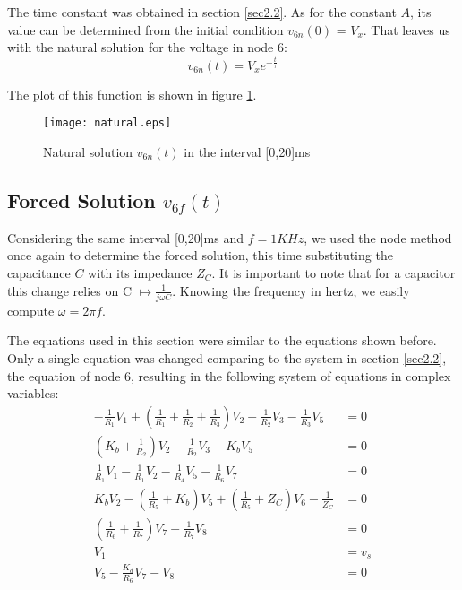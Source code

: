 The time constant was obtained in section \ref{sec2.2}. As for the constant $A$, its value can be determined from the initial condition $v_{6n}(0)$ = $V_x$. That leaves us with the natural solution for the voltage in node 6:
\begin{equation}
    v_{6n}(t) = V_x e^{-\frac{t}{\tau}}
\end{equation}

The plot of this function is shown in figure \ref{fig2}.

\begin{figure}[!htp] \centering
\texttt{[image: natural.eps]}
\caption{Natural solution $v_{6n}(t)$ in the interval [0,20]ms}
\label{fig2}
\end{figure}
\FloatBarrier

\subsection{Forced Solution $v_{6f}(t)$}\label{sec2.4}

Considering the same interval [0,20]ms and $f=1 KHz$, we used the node method once again to determine the forced solution, this time substituting the capacitance $C$ with its impedance $Z_C$. It is important to note that for a capacitor this change relies on C $\mapsto \frac{1}{j \omega C}$. Knowing the frequency in hertz, we easily compute $\omega=2 \pi f$.

The equations used in this section were similar to the equations shown before. Only a single equation was changed comparing to the system in section \ref{sec2.2}, the equation of node 6, resulting in the following system of equations in complex variables:
\begin{equation} \label{eq4}
\begin{split}
-\frac{1}{R_1}V_1+\left(\frac{1}{R_1}+\frac{1}{R_2}+\frac{1}{R_3}\right)V_2-\frac{1}{R_2}V_3-\frac{1}{R_3}V_5&=0\\
\left(K_b+\frac{1}{R_2}\right)V_2-\frac{1}{R_2}V_3-K_b V_5&=0\\
\frac{1}{R_1}V_1-\frac{1}{R_1}V_2-\frac{1}{R_4}V_5-\frac{1}{R_6}V_7&=0\\
K_bV_2 - (\frac{1}{R_5}+K_b)V_5 + (\frac{1}{R_5}+Z_C)V_6 - \frac{1}{Z_C}&=0\\
\left(\frac{1}{R_6}+\frac{1}{R_7}\right)V_7-\frac{1}{R_7}V_8&=0\\
V_1&=v_s \\
V_5-\frac{K_d}{R_6}V_7-V_8&=0
\end{split}
\end{equation}

